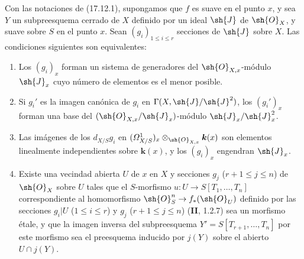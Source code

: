 \begin{corollary}[17.12.2]
\label{IV.17.12.2}
Con las notaciones de \textup{(17.12.1)}, supongamos que $f$ es suave en el punto $x$, y sea $Y$ un subpreesquema cerrado de $X$ definido por un ideal $\sh{J}$ de $\sh{O}_X$, y suave sobre $S$ en el punto $x$. Sean $(g_i)_{1\leq i\leq r}$ secciones de $\sh{J}$ sobre $X$. Las condiciones siguientes son equivalentes:
\begin{enumerate}
  \item[\textup{a)}] Los $(g_i)_x$ forman un sistema de generadores del $\sh{O}_{X,x}$-módulo $\sh{J}_x$ cuyo número de elementos es el menor posible.
  \item[\textup{b)}] Si $g_i'$ es la imagen canónica de $g_i$ en $\Gamma(X,\sh{J}/\sh{J}^2)$, los $(g_i')_x$ forman una base del $(\sh{O}_{X,x}/\sh{J}_x)$-módulo $\sh{J}_x/\sh{J}_x^2$.


  \item[\textup{c)}] Las imágenes de los $d_{X/S}g_i$ en $(\varOmega^1_{X/S})_x\otimes_{\sh{O}_{X,x}}\boldsymbol{k}(x)$ son elementos linealmente independientes sobre $\boldsymbol{k}(x)$, y los $(g_i)_x$ engendran $\sh{J}_x$.
  \item[\textup{d)}] Existe una vecindad abierta $U$ de $x$ en $X$ y secciones $g_j$ \textup{($r+1\leq j\leq n$)} de $\sh{O}_X$ sobre $U$ tales que el $S$-morfismo $u:U\to S[T_1,\ldots,T_n]$ correspondiente al homomorfismo $\sh{O}_S^n\to f_*(\sh{O}_U)$ definido por las secciones $g_i|U$ \textup{($1\leq i\leq r$)} y $g_j$ \textup{($r+1\leq j\leq n$)} \textup{(\textbf{II}, 1.2.7)} sea un morfismo étale, y que la imagen inversa del subpreesquema $Y'=S[T_{r+1},\ldots,T_n]$ por este morfismo sea el preesquema inducido por $j(Y)$ sobre el abierto $U\cap j(Y)$.
\end{enumerate}
\end{corollary}

